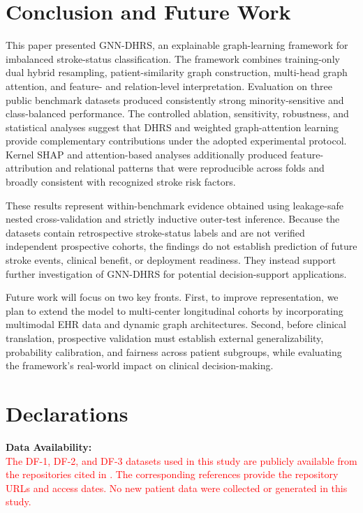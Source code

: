 \documentclass[pdflatex,sn-mathphys-num]{sn-jnl}%
\theoremstyle{thmstyleone}%
\theoremstyle{thmstyletwo}%
\theoremstyle{thmstylethree}%
\begin{document}
{\section{Conclusion and Future Work}
\label{sec:conclusion}

This paper presented GNN-DHRS, an explainable graph-learning framework for
imbalanced stroke-status classification. The framework combines training-only
dual hybrid resampling, patient-similarity graph construction, multi-head
graph attention, and feature- and relation-level interpretation. Evaluation
on three public benchmark datasets produced consistently strong
minority-sensitive and class-balanced performance. The controlled ablation,
sensitivity, robustness, and statistical analyses suggest that DHRS and
weighted graph-attention learning provide complementary contributions under
the adopted experimental protocol. Kernel SHAP and attention-based analyses
additionally produced feature-attribution and relational patterns that were
reproducible across folds and broadly consistent with recognized stroke risk
factors.

 {
These results represent within-benchmark evidence obtained using leakage-safe
nested cross-validation and strictly inductive outer-test inference. Because
the datasets contain retrospective stroke-status labels and are not verified
independent prospective cohorts, the findings do not establish prediction of
future stroke events, clinical benefit, or deployment readiness. They instead
support further investigation of GNN-DHRS for potential decision-support
applications.
}

Future work will focus on two key fronts. First, to improve representation, we plan to extend the model to multi-center longitudinal cohorts by incorporating multimodal EHR data and dynamic graph architectures. Second, before clinical translation, prospective validation must establish external generalizability, probability calibration, and fairness across patient subgroups, while evaluating the framework's real-world impact on clinical decision-making.
\section*{Declarations}
\noindent \textbf{Data Availability:}\\
\textcolor{red}{
The DF-1, DF-2, and DF-3 datasets used in this study are publicly available
from the repositories cited in
\cite{dataset_df1,dataset_df2,dataset_df3}.
The corresponding references provide the repository URLs and access dates.
No new patient data were collected or generated in this study.
} \\

}
\end{document}
